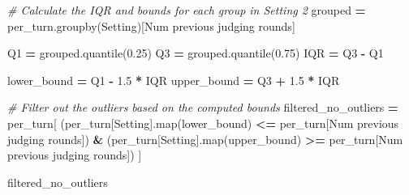 \documentclass[
]{article}
\newenvironment{Shaded}{\begin{snugshade}}{\end{snugshade}}
\newcommand{\BuiltInTok}[1]{#1}
\newcommand{\CommentTok}[1]{\textcolor[rgb]{0.56,0.35,0.01}{\textit{#1}}}
\newcommand{\FloatTok}[1]{\textcolor[rgb]{0.00,0.00,0.81}{#1}}
\newcommand{\NormalTok}[1]{#1}
\newcommand{\OperatorTok}[1]{\textcolor[rgb]{0.81,0.36,0.00}{\textbf{#1}}}
\newcommand{\StringTok}[1]{\textcolor[rgb]{0.31,0.60,0.02}{#1}}
\begin{document}
\begin{Shaded}
\begin{Highlighting}[]
\CommentTok{\# Calculate the IQR and bounds for each group in \textquotesingle{}Setting 2\textquotesingle{}}
\NormalTok{grouped }\OperatorTok{=}\NormalTok{ per\_turn.groupby(}\StringTok{\textquotesingle{}Setting\textquotesingle{}}\NormalTok{)[}\StringTok{\textquotesingle{}Num previous judging rounds\textquotesingle{}}\NormalTok{]}

\NormalTok{Q1 }\OperatorTok{=}\NormalTok{ grouped.quantile(}\FloatTok{0.25}\NormalTok{)}
\NormalTok{Q3 }\OperatorTok{=}\NormalTok{ grouped.quantile(}\FloatTok{0.75}\NormalTok{)}
\NormalTok{IQR }\OperatorTok{=}\NormalTok{ Q3 }\OperatorTok{{-}}\NormalTok{ Q1}

\NormalTok{lower\_bound }\OperatorTok{=}\NormalTok{ Q1 }\OperatorTok{{-}} \FloatTok{1.5} \OperatorTok{*}\NormalTok{ IQR}
\NormalTok{upper\_bound }\OperatorTok{=}\NormalTok{ Q3 }\OperatorTok{+} \FloatTok{1.5} \OperatorTok{*}\NormalTok{ IQR}

\CommentTok{\# Filter out the outliers based on the computed bounds}
\NormalTok{filtered\_no\_outliers }\OperatorTok{=}\NormalTok{ per\_turn[}
\NormalTok{    (per\_turn[}\StringTok{\textquotesingle{}Setting\textquotesingle{}}\NormalTok{].}\BuiltInTok{map}\NormalTok{(lower\_bound) }\OperatorTok{\textless{}=}\NormalTok{ per\_turn[}\StringTok{\textquotesingle{}Num previous judging rounds\textquotesingle{}}\NormalTok{]) }\OperatorTok{\&}
\NormalTok{    (per\_turn[}\StringTok{\textquotesingle{}Setting\textquotesingle{}}\NormalTok{].}\BuiltInTok{map}\NormalTok{(upper\_bound) }\OperatorTok{\textgreater{}=}\NormalTok{ per\_turn[}\StringTok{\textquotesingle{}Num previous judging rounds\textquotesingle{}}\NormalTok{])}
\NormalTok{]}

\NormalTok{filtered\_no\_outliers}
\end{Highlighting}
\end{Shaded}
\end{document}
